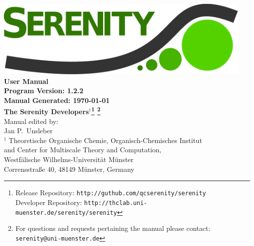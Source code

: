 \documentclass[bibliography=totocnumbered,a4paper,10pt]{scrartcl}
\begin{document}
\thispagestyle{empty}
\begin{center}
\vspace*{1cm}
\includegraphics[width=0.95\textwidth]{./figs/SerenityLogo.png}\\
\vspace{2cm}
{\LARGE\textbf{
User Manual
}}\\
\vspace{1cm}
{\large\textbf{
Program Version: 1.2.2\\
Manual Generated: \today
}}\\
\vspace{2cm}
{\large\textbf{ 
The Serenity Developers$^{\dagger}$\footnote{Release Repository: \texttt{http://guthub.com/qcserenity/serenity}\\
                                             Developer Repository: \texttt{http://thclab.uni-muenster.de/serenity/serenity}}
\footnote{For questions and requests pertaining the manual please contact:\\ \texttt{serenity@uni-muenster.de}}
}}\\
\vspace{2cm}
{\large Manual edited by: \\
Jan P.\ Unsleber
}
\\[2ex]

$^{\dagger}$ Theoretische Organische Chemie,
Organisch-Chemisches Institut \\
and Center for Multiscale Theory and Computation,\\
Westf\"alische Wilhelms-Universit\"at M\"unster\\
Corrensstra{\ss}e 40, 48149 M\"unster, Germany\\[2ex]

\vfill
\end{center}
\newpage
{}
\setcounter{page}{1}
\tableofcontents

\newpage
{}
\setcounter{page}{1}
\end{document}
